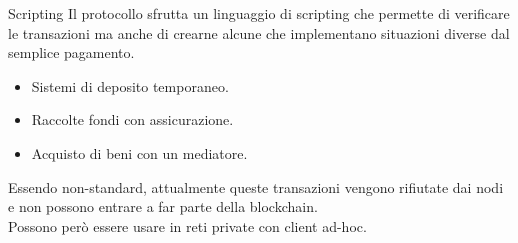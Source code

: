 \documentclass[italian]{beamer}
\begin{document}
\begin{frame}{Scripting}
Il protocollo sfrutta un linguaggio di scripting che permette di verificare le transazioni ma anche di crearne alcune che implementano situazioni diverse dal semplice pagamento.
\begin{itemize}
\item Sistemi di deposito temporaneo.
\item Raccolte fondi con assicurazione.
\item Acquisto di beni con un mediatore.
\end{itemize}
\bigskip
\pause
Essendo non-standard, attualmente queste transazioni vengono rifiutate dai nodi e non possono entrare a far parte della blockchain.\\
Possono però essere usare in reti private con client ad-hoc.
\end{frame}

%
%
%
%
\end{document}

